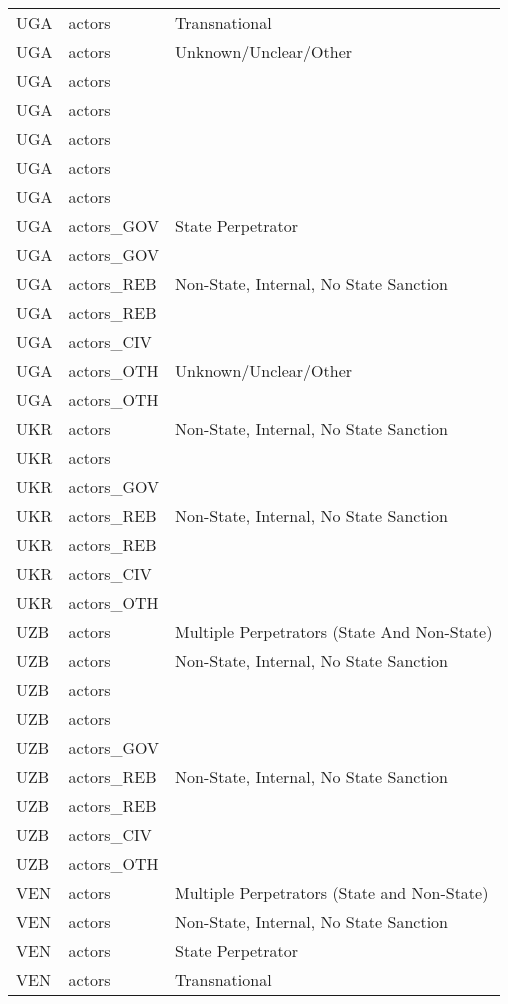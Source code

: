 \begin{table}[ht]
\begin{tabular}{lll}
  UGA & actors & Transnational \\ 
  UGA & actors & Unknown/Unclear/Other \\ 
  UGA & actors &  \\ 
  UGA & actors &  \\ 
  UGA & actors &  \\ 
  UGA & actors &  \\ 
  UGA & actors &  \\ 
  UGA & actors\_GOV & State Perpetrator \\ 
  UGA & actors\_GOV &  \\ 
  UGA & actors\_REB & Non-State, Internal, No State Sanction \\ 
  UGA & actors\_REB &  \\ 
  UGA & actors\_CIV &  \\ 
  UGA & actors\_OTH & Unknown/Unclear/Other \\ 
  UGA & actors\_OTH &  \\ 
  UKR & actors & Non-State, Internal, No State Sanction \\ 
  UKR & actors &  \\ 
  UKR & actors\_GOV &  \\ 
  UKR & actors\_REB & Non-State, Internal, No State Sanction \\ 
  UKR & actors\_REB &  \\ 
  UKR & actors\_CIV &  \\ 
  UKR & actors\_OTH &  \\ 
  UZB & actors & Multiple Perpetrators (State And Non-State) \\ 
  UZB & actors & Non-State, Internal, No State Sanction \\ 
  UZB & actors &  \\ 
  UZB & actors &  \\ 
  UZB & actors\_GOV &  \\ 
  UZB & actors\_REB & Non-State, Internal, No State Sanction \\ 
  UZB & actors\_REB &  \\ 
  UZB & actors\_CIV &  \\ 
  UZB & actors\_OTH &  \\ 
  VEN & actors & Multiple Perpetrators (State and Non-State) \\ 
  VEN & actors & Non-State, Internal, No State Sanction \\ 
  VEN & actors & State Perpetrator \\ 
  VEN & actors & Transnational \\ 

\end{tabular}
\end{table}
